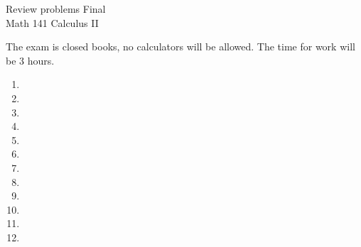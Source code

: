 \documentclass{article}
\begin{document}
\begin{center}
\Large
Review problems Final\\ Math 141 Calculus II \\
\end{center}


\noindent The exam is closed books, no calculators will be allowed. The time for work will be 3 hours. 

\begin{enumerate}
\item 
\item 
\item 

\item 
\item 

\item 

\item 
\item 

\item 

\item 

\item 

\item 


\end{enumerate}
\end{document}
